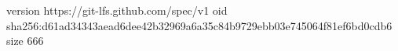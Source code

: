 version https://git-lfs.github.com/spec/v1
oid sha256:d61ad34343aead6dee42b32969a6a35c84b9729ebb03e745064f81ef6bd0cdb6
size 666
